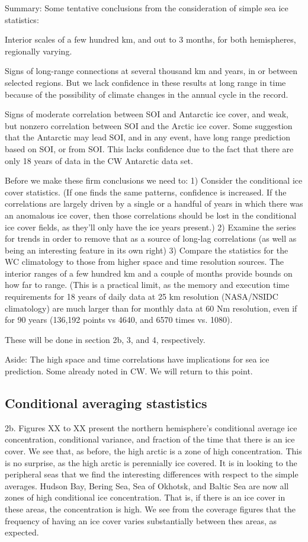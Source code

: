   
Summary:
  Some tentative conclusions from the consideration of simple sea ice
statistics:

  Interior scales of a few hundred km, and out to 3 months, for both 
hemispheres, regionally varying.

  Signs of long-range connections at several thousand km and years, in 
or between selected regions.  But we lack confidence in these results
at long range in time because of the possibility of climate changes in 
the annual cycle in the record.

  Signs of moderate correlation between SOI and Antarctic ice cover, and
weak, but nonzero correlation between SOI and the Arctic ice cover.  Some
suggestion that the Antarctic may lead SOI, and in any event, have long
range prediction based on SOI, or from SOI. This lacks confidence due to
the fact that there are only 18 years of data in the CW Antarctic data
set.

Before we make these firm conclusions we need to:
1) Consider the conditional ice cover statistics.  (If one finds the same
patterns, confidence is increased.  If the correlations are largely driven
by a single or a handful of years in which there was an anomalous ice cover,
then those correlations should be lost in the conditional ice cover fields,
as they'll only have the ice years present.)
2) Examine the series for trends in order to remove that as a 
source of long-lag correlations (as well as being an interesting 
feature in its own right)
3) Compare the statistics for the WC climatology to those from higher space
and time resolution sources.  The interior ranges of a few hundred km and
a couple of months provide bounds on how far to range.  (This is a practical
limit, as the memory and execution time requirements for 18 years of daily
data at 25 km resolution (NASA/NSIDC climatology) are much larger than for
monthly data at 60 Nm resolution, even if for 90 years (136,192 points
vs 4640, and 6570 times vs. 1080). 

  These will be done in section 2b, 3, and 4, respectively.

Aside: The high space and time correlations have implications for sea ice
prediction.  Some already noted in CW.  We will return to this point. 


\subsection{Conditional averaging stastistics}
2b.
  Figures XX to XX present the northern hemisphere's conditional average
ice concentration, conditional variance, and fraction of the time that
there is an ice cover.  We see that, as before, the high arctic is a 
zone of high concentration.  This is no surprise, as the high arctic is
perennially ice covered.  It is in looking to the peripheral seas that
we find the interesting differences with respect to the simple averages.
Hudson Bay, Bering Sea, Sea of Okhotsk, and Baltic Sea are now all zones 
of high conditional ice concentration.  That is, if there is an ice cover
in these areas, the concentration is high.  We see from the coverage figures
that the frequency of having an ice cover varies substantially between 
thes areas, as expected.  

